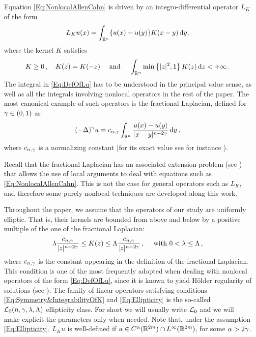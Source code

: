 Equation \eqref{Eq:NonlocalAllenCahn} is driven by an integro-differential operator $L_K$ of the form
\begin{equation}
\label{Eq:DefOfLu}
L_Ku(x) = \int_{\mathbb{R}^n} \{u(x) - u(y)\} K(x-y)\,\mathrm{d} y,
\end{equation}
where the kernel $K$ satisfies
\begin{equation}
\label{Eq:Symmetry&IntegrabilityOfK}
K\geq 0\,, \quad K(z) = K(-z) \quad \textrm{ and } \quad \int_{\mathbb{R}^n} \min \left\{ |z|^2, 1 \right\} K(z) \,\mathrm{d} z < + \infty\,.
\end{equation}
The integral in \eqref{Eq:DefOfLu} has to be understood in the principal value sense, as well as all the integrals involving nonlocal operators in the rest of the paper.
The most canonical example of such operators is the fractional Laplacian, defined for $\gamma\in(0,1)$ as
$$
(-\Delta)^\gamma u = c_{n, \gamma} \int_{\mathbb{R}^n} \dfrac{u(x) - u(y)}{|x-y|^{n + 2\gamma}}\,\mathrm{d} y\,,
$$
where $c_{n, \gamma}$ is a normalizing constant (for its exact value see for instance \cite{HitchhikerGuide}).

Recall that the fractional Laplacian has an associated extension problem (see \cite{CaffarelliSilvestre}) that allows the use of local arguments to deal with equations such as \eqref{Eq:NonlocalAllenCahn}. This is not the case for general operators such as $L_K$, and therefore some purely nonlocal techniques are developed along this work. 

Throughout the paper, we assume that the operators of our study are uniformly elliptic. That is, their kernels are bounded from above and below by a positive multiple of the one of the fractional Laplacian:
\begin{equation}
\label{Eq:Ellipticity}
\lambda \dfrac{c_{n,\gamma}}{|z|^{n+2\gamma}} \leq K(z) \leq \Lambda \dfrac{c_{n,\gamma}}{|z|^{n+2\gamma}}\,, \quad \text{ with }  0< \lambda \leq \Lambda \,,
\end{equation}
where $c_{n,\gamma}$ is the constant appearing in the definition of the fractional Laplacian. This condition is one of the most frequently adopted when dealing with nonlocal operators of the form \eqref{Eq:DefOfLu}, since it is known to yield Hölder regularity of solutions (see \cite{RosOton-Survey,SerraC2s+alphaRegularity}). The family of linear operators satisfying conditions \eqref{Eq:Symmetry&IntegrabilityOfK} and \eqref{Eq:Ellipticity} is the so-called $\mathcal{L}_0(n,\gamma,\lambda, \Lambda)$ ellipticity class. For short we will usually write $\mathcal{L}_0$ and we will make explicit the parameters only when needed. Note that, under the assumption \eqref{Eq:Ellipticity}, $L_K u$ is well-defined if $u\in C^\alpha(\mathbb{R}^{2m})\cap L^\infty(\mathbb{R}^{2m})$, for some $\alpha > 2 \gamma$. 


